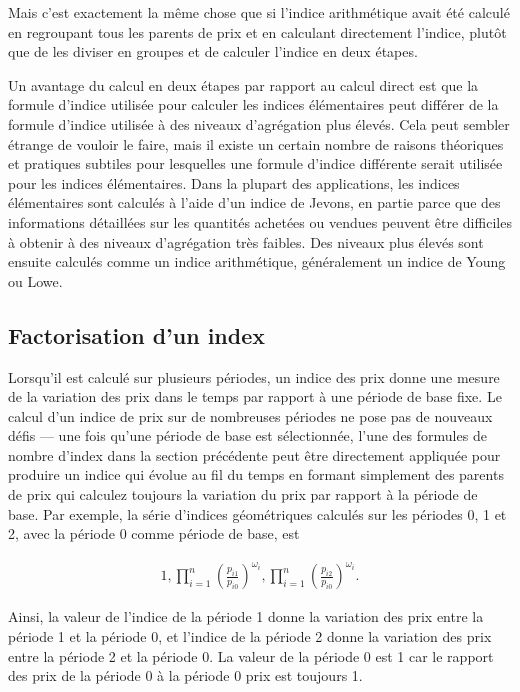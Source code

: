 \documentclass[]{article}
\begin{document}
Mais c'est exactement la même chose que si l'indice arithmétique avait été calculé en regroupant tous les parents de prix et en calculant directement l'indice, plutôt que de les diviser en groupes et de calculer l'indice en deux étapes.

Un avantage du calcul en deux étapes par rapport au calcul direct est que la formule d'indice utilisée pour calculer les indices élémentaires peut différer de la formule d'indice utilisée à des niveaux d'agrégation plus élevés. Cela peut sembler étrange de vouloir le faire, mais il existe un certain nombre de raisons théoriques et pratiques subtiles pour lesquelles une formule d'indice différente serait utilisée pour les indices élémentaires. Dans la plupart des applications, les indices élémentaires sont calculés à l'aide d'un indice de Jevons, en partie parce que des informations détaillées sur les quantités achetées ou vendues peuvent être difficiles à obtenir à des niveaux d'agrégation très faibles. Des niveaux plus élevés sont ensuite calculés comme un indice arithmétique, généralement un indice de Young ou Lowe.

\hypertarget{factorisation-dun-index}{%
\subsection{Factorisation d'un index}\label{factorisation-dun-index}}

Lorsqu'il est calculé sur plusieurs périodes, un indice des prix donne une mesure de la variation des prix dans le temps par rapport à une période de base fixe. Le calcul d'un indice de prix sur de nombreuses périodes ne pose pas de nouveaux défis --- une fois qu'une période de base est sélectionnée, l'une des formules de nombre d'index dans la section précédente peut être directement appliquée pour produire un indice qui évolue au fil du temps en formant simplement des parents de prix qui calculez toujours la variation du prix par rapport à la période de base. Par exemple, la série d'indices géométriques calculés sur les périodes 0, 1 et 2, avec la période 0 comme période de base, est

\begin{align*}
1, \prod_{i = 1}^{n} \left (\frac{p_{i1}}{p_{i0}} \right)^{\omega_{i}}, \prod_{i = 1}^{n} \left (\frac{p_{i2}}{p_{i0}} \right)^{\omega_{i}}.
\end{align*}

Ainsi, la valeur de l'indice de la période 1 donne la variation des prix entre la période 1 et la période 0, et l'indice de la période 2 donne la variation des prix entre la période 2 et la période 0. La valeur de la période 0 est 1 car le rapport des prix de la période 0 à la période 0 prix est toujours 1.
\end{document}
